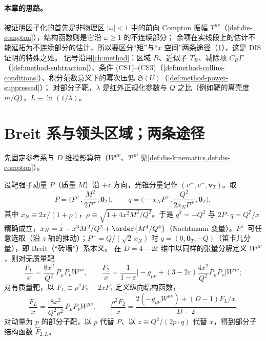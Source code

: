 \paragraph{本章的思路。}
被证明因子化的首先是非物理区 $|\omega|<1$ 中的前向 Compton 振幅 $T^{\mu\nu}$（\cref{def:dis-compton}），结构函数则是它沿 $\omega\ge1$ 的不连续部分；
余项在实线段上的估计不能延拓为不连续部分的估计，所以要区分“矩”与“$x$ 空间”两条途径（\cref{sec:disall-regions}），这是 DIS 证明的特殊之处。
记号沿用\cref{ch:method}：区域 $R$、近似子 $T_R$、减除项 $C_R\Gamma$（\cref{def:method-subtraction}）、条件 (CS1)–(CS3)（\cref{def:method-collins-conditions}）、积分范数意义下的幂次压低 $\mathfrak S(U)$（\cref{def:method-power-suppressed}）；
对部分子靶，$\lambda$ 是红外正规化参数与 $Q$ 之比（例如靶的离壳度 $m/Q$），$L\equiv\ln(1/\lambda)$。

\section{Breit 系与领头区域；两条途径}\label{sec:disall-regions}

先固定参考系与 $D$ 维投影算符（$W^{\mu\nu}$、$T^{\mu\nu}$ 见\cref{def:dis-kinematics,def:dis-compton}）。

\begin{definition}\label{def:disall-breit}
设靶强子动量 $P$（质量 $M$）沿 $+z$ 方向，光锥分量记作 $(v^+,v^-,\mathbf v_T)$。取
\begin{equation}\label{eq:disall-breit}
P=\Big(P^+,\frac{M^2}{2P^+},\mathbf 0_T\Big),\qquad q=\Big(-x_NP^+,\frac{Q^2}{2x_NP^+},\mathbf 0_T\Big),
\end{equation}
其中 $x_N\equiv2x/(1+\rho)$，$\rho\equiv\sqrt{1+4x^2M^2/Q^2}$。于是 $q^2=-Q^2$ 与 $2P\cdot q=Q^2/x$ 精确成立，$x_N=x-x^3M^2/Q^2+\order{M^4/Q^4}$（Nachtmann 变量）。$P^+$ 可任意选取（沿 $z$ 轴的推动）；$P^+=Q/(\sqrt2\,x_N)$ 时 $q=(0,\mathbf 0_T,-Q)$（笛卡儿分量），即 Breit（“砖墙”）系本义。
在 $D=4-2\varepsilon$ 维中以同样的张量分解定义 $W^{\mu\nu}$，则对无质量靶
\begin{equation}\label{eq:disall-proj}
\frac{F_L}{x}=\frac{8x^2}{Q^2}\,P_\mu P_\nu W^{\mu\nu},\qquad
\frac{F_2}{x}=\frac1{1-\varepsilon}\Big[-g_{\mu\nu}+(3-2\varepsilon)\frac{4x^2}{Q^2}P_\mu P_\nu\Big]W^{\mu\nu};   %
\end{equation}
对有质量靶，以 $F_L\equiv\rho^2F_2-2xF_1$ 定义纵向结构函数，
\begin{equation}\label{eq:disall-proj-massive}
\frac{F_L}{x}=\frac{8x^2}{Q^2\rho^2}\,P_\mu P_\nu W^{\mu\nu},\qquad
\frac{\rho^2F_2}{x}=\frac{2(-g_{\mu\nu}W^{\mu\nu})+(D-1)F_L/x}{D-2}.   %
\end{equation}
对动量为 $p$ 的部分子靶，以 $p$ 代替 $P$、以 $z\equiv Q^2/(2p\cdot q)$ 代替 $x$，得到部分子结构函数 $\hat F_{2,L}$。
\end{definition}

